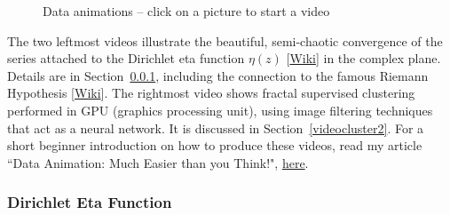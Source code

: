 \documentclass[10pt]{article}
\begin{document}
\begin{figure}[H]%
    \centering
    \qquad
   \qquad
    \caption{Data animations -- click on a picture to start a video}%
    \label{fig:example67}%
\end{figure}


The two leftmost videos illustrate the beautiful, semi-chaotic convergence of the series attached to the \textcolor{index}{Dirichlet eta function} 
$\eta(z)$ [\href{https://en.wikipedia.org/wiki/Dirichlet_eta_function}{Wiki}] in the complex plane. 
Details are in Section~\ref{videocluster1}, including the connection to the famous 
\textcolor{index}{Riemann Hypothesis} [\href{https://en.wikipedia.org/wiki/Riemann_hypothesis}{Wiki}]. The rightmost video shows 
\textcolor{index}{fractal supervised clustering} performed in GPU (graphics processing unit),  using 
\textcolor{index}{image filtering techniques} that act as a \textcolor{index}{neural network}. It is discussed in Section~\ref{videocluster2}. For a short beginner introduction on how to produce these videos, read my
article ``Data Animation: Much Easier than you Think!", \href{https://www.datasciencecentral.com/data-animation-much-easier-than-you-think/}{here}.

\subsubsection{Dirichlet Eta Function}\label{videocluster1}
\end{document}
